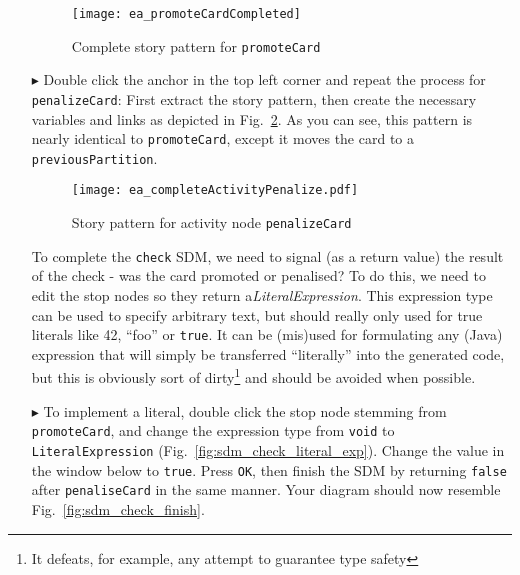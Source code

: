 \begin{itemize}
\begin{figure}[htbp]
\begin{center}
  \texttt{[image: ea\_promoteCardCompleted]}
  \caption{Complete story pattern for \texttt{promoteCard}}
  \label{fig:sdm_check_complete_activity_node}
\end{center}
\end{figure}

\clearpage

\item[$\blacktriangleright$] Double click the anchor in the top left corner and repeat the process for \texttt{penalizeCard}: First extract the story pattern,
then create the necessary variables and links as depicted in Fig.~\ref{fig:sdm_check_complete_penalize}. As you can see, this pattern is nearly identical to
\texttt{promoteCard}, except it moves the card to a \texttt{previousPartition}.

\vspace{0.5cm}

\begin{figure}[htbp]
\begin{center}
  \texttt{[image: ea\_completeActivityPenalize.pdf]}
  \caption{Story pattern for activity node \texttt{penalizeCard}}
  \label{fig:sdm_check_complete_penalize}
\end{center}
\end{figure}


\vspace{0.5cm}

To complete the \texttt{check} SDM, we need to signal (as a return value) the result of the check - was the card promoted or penalised? To do this, we need to
edit the stop nodes so they return a\emph{LiteralExpression}. This expression type can be used to specify arbitrary text, but
should really only used for true literals like 42, ``foo'' or \texttt{true}. It can be (mis)used for formulating any (Java) expression that will simply be
transferred ``literally'' into the generated code, but this is obviously sort of dirty\footnote{It defeats, for example, any attempt to guarantee type safety}
and should be avoided when possible.

\item[$\blacktriangleright$] To implement a literal, double click the stop node stemming from  \texttt{promoteCard}, and change the expression type from
\texttt{void} to \texttt{LiteralEx\-pression} (Fig.~\ref{fig:sdm_check_literal_exp}). Change the value in the window below to \texttt{true}. Press \texttt{OK},
then finish the SDM by returning \texttt{false} after \texttt{penaliseCard} in the same manner. Your diagram should now resemble
Fig.~\ref{fig:sdm_check_finish}.


\end{itemize}
